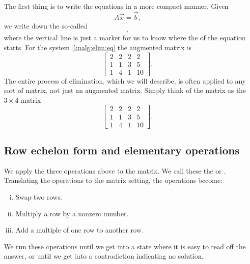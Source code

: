 The first thing is to write the equations in a more compact manner.  Given
\begin{equation*}
A \vec{x} = \vec{b} ,
\end{equation*}
we write down the so-called \emph{}
\begin{equation*}
[ A ~|~ \vec{b} ] ,
\end{equation*}
where the vertical line is just a marker for us to know where the
 of the equation starts.
For the system \eqref{linalg:elim:eq} the augmented matrix is
\begin{equation*}
\left[
\begin{array}{ccc|c}
2 & 2 & 2 & 2 \\
1 & 1 & 3 & 5 \\
1 & 4 & 1 & 10
\end{array}
\right] .
\end{equation*}
The entire process of elimination, which we will describe,
is often applied to any sort of matrix,
not just an
augmented matrix.
Simply think of the matrix as the $3 \times 4$ matrix
\begin{equation*}
\begin{bmatrix}
2 & 2 & 2 & 2 \\
1 & 1 & 3 & 5 \\
1 & 4 & 1 & 10
\end{bmatrix} .
\end{equation*}

\subsection{Row echelon form and elementary operations}

We apply the three operations above to the matrix.  We call these
the \emph{} or
\emph{}.
Translating the operations to the matrix setting,
the operations become:
\begin{enumerate}[(i)]
\item Swap two rows.
\item Multiply a row by a nonzero number.
\item Add a multiple of one row to another row.
\end{enumerate}
\pagebreak[2]
We run these operations until we
get into a state where it is easy to read off the answer,
or until we get into a contradiction indicating no solution.

